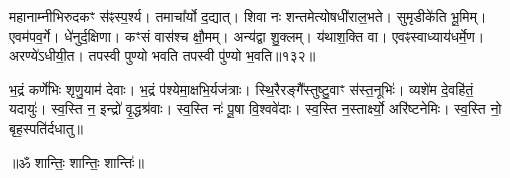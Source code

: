 महानाम्नीभिरुदकꣳ स॑ꣴस्प॒र्श्य। तमाचा᳚र्यो द॒द्यात्। 
शिवा नः शन्तमेत्योषधी॑राल॒भते। सुमृडीके॑ति भू॒मिम्। 
एवम॑पव॒र्गे। धे॑नुर्द॒क्षिणा। कꣳसं वास॑श्च क्षौ॒मम्। 
अन्य॑द्वा शु॒क्लम्। य॑थाश॒क्ति वा। एवꣴस्वाध्याय॑धर्मे॒ण। 
अरण्ये॑ऽधीयी॒त। तपस्वी पुण्यो भवति तपस्वी पु॑ण्यो भ॒वति॥१३२॥\anuvakamend


भ॒द्रं कर्णे॑भिः शृणु॒याम॑ देवाः। भ॒द्रं प॑श्येमा॒क्षभि॒र्यज॑त्राः। 
स्थि॒रैरङ्गै᳚स्तुष्टु॒वाꣳ स॑स्त॒नूभिः॑। व्यशे॑म दे॒वहि॑तं॒ यदायुः॑। 
स्व॒स्ति न॒ इन्द्रो॑ वृ॒द्धश्र॑वाः। स्व॒स्ति नः॑ पू॒षा वि॒श्ववे॑दाः। 
स्व॒स्ति न॒स्तार्क्ष्यो॒ अरि॑ष्टनेमिः। स्व॒स्ति नो॒ बृह॒स्पति॑र्दधातु॥\\

\centerline{॥ॐ शान्तिः॒ शान्तिः॒ शान्तिः॑॥}
